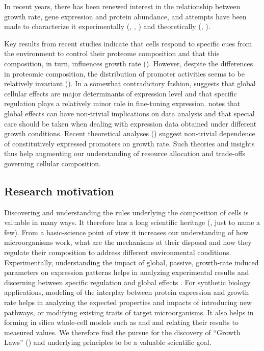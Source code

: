 \documentclass[a4page,notitlepage]{article}
\begin{document}
In recent years, there has been renewed interest in the relationship between growth rate, gene expression and protein abundance, and attempts have been made to characterize it experimentally (\parencite{Zaslaver2009a}, \parencite{Levy2009}, \parencite{Berthoumieux2013}) and theoretically (\parencite{Klumpp2009a}, \parencite{Scott2010b}).

Key results from recent studies indicate that cells respond to specific cues from the environment to control their proteome composition and that this composition, in turn, influences growth rate (\parencite{Levy2009}).
However, despite the differences in proteomic composition, the distribution of promoter activities seems to be relatively invariant (\parencite{Zaslaver2009a}).
In a somewhat contradictory fashion, \parencite{Berthoumieux2013} suggests that global cellular effects are major determinants of expression level and that specific regulation plays a relatively minor role in fine-tuning expression.
\parencite{loven2012} notes that global effects can have non-trivial implications on data analysis and that special care should be taken when dealing with expression data obtained under different growth conditions.
Recent theoretical analyses (\parencite{Klumpp2009a,Scott2010b}) suggest non-trivial dependence of constitutively expressed promoters on growth rate.
Such theories and insights thus help augmenting our understanding of resource allocation and trade-offs governing cellular composition.

\subsection{Research motivation}
Discovering and understanding the rules underlying the composition of cells is valuable in many ways.
It therefore has a long scientific heritage (\parencite{Schaechter1958, Maaloe1969, Bremer1987, Klumpp2009a}, just to name a few).
From a basic-science point of view it increases our understanding of how microorganisms work, what are the mechanisms at their disposal and how they regulate their composition to address different environmental conditions.
Experimentally, understanding the impact of global, passive, growth-rate induced parameters on expression patterns helps in analyzing experimental results and discerning between specific regulation and global effects \parencite{loven2012}.
For synthetic biology applications, modeling of the interplay between protein expression and growth rate helps in analyzing the expected properties and impacts of introducing new pathways, or modifying existing traits of target microorganisms.
It also helps in forming in silico whole-cell models such as \parencite{Lerman2012} and \parencite{Karr2012} and relating their results to measured values.
We therefore find the pursue for the discovery of ``Growth Laws'' (\parencite{Scott2010b}) and underlying principles to be a valuable scientific goal.
\end{document}

